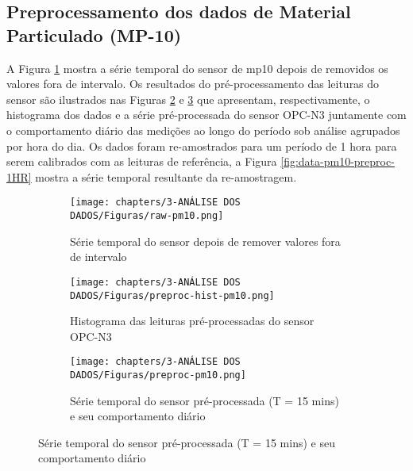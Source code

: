 
\subsection{Preprocessamento dos dados de Material Particulado (MP-10)}

A Figura \ref{fig:data-pm10-raw} mostra a série temporal do sensor de \acrshort{mp10} depois de removidos os valores fora de intervalo. Os resultados do pré-processamento das leituras do sensor são ilustrados nas Figuras \ref{fig:data-pm10-preproc-hist} e \ref{fig:data-pm10-preproc-15} que apresentam, respectivamente, o histograma dos dados e a série pré-processada do sensor OPC-N3 juntamente com o comportamento diário das medições ao longo do período sob análise agrupados por hora do dia. Os dados foram re-amostrados para um período de 1 hora para serem calibrados com as leituras de referência, a Figura \ref{fig:data-pm10-preproc-1HR} mostra a série temporal resultante da re-amostragem.

\begin{figure}[h]
    \centering
    \caption{Série temporal das leituras do sensor OPC-N3}
    \begin{subfigure}{0.495\textwidth}
        \texttt{[image: chapters/3-ANÁLISE DOS DADOS/Figuras/raw-pm10.png]}
        \caption{Série temporal do sensor depois de remover valores fora de intervalo}
        \label{fig:data-pm10-raw}
    \end{subfigure}
    \hfill
    \begin{subfigure}{0.495\textwidth}
        \texttt{[image: chapters/3-ANÁLISE DOS DADOS/Figuras/preproc-hist-pm10.png]}
        \caption{Histograma das leituras pré-processadas do sensor OPC-N3}
        \label{fig:data-pm10-preproc-hist}
    \end{subfigure}
    \begin{subfigure}{0.99\textwidth}
        \texttt{[image: chapters/3-ANÁLISE DOS DADOS/Figuras/preproc-pm10.png]}
        \caption{Série temporal do sensor pré-processada (T = 15 mins) e seu comportamento diário}
        \label{fig:data-pm10-preproc-15}
    \end{subfigure}
    \hfill
    \label{fig:data-pm10-15}
\end{figure}

